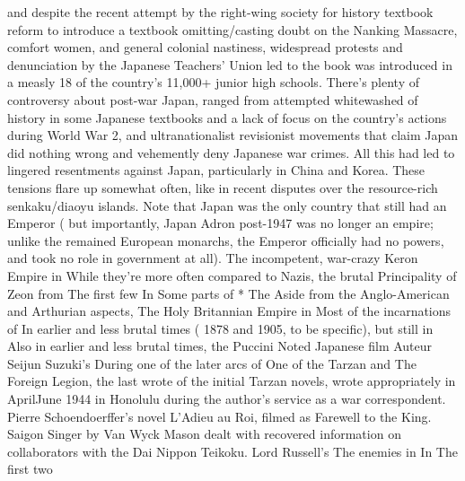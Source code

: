 \documentclass[12pt]{book}
\begin{document}
and despite the recent attempt by the right-wing society for history textbook reform to introduce a textbook omitting/casting doubt on the Nanking Massacre, comfort women, and general colonial nastiness, widespread protests and denunciation by the Japanese Teachers' Union led to the book was introduced in a measly 18 of the country's 11,000+ junior high schools. There's plenty of controversy about post-war Japan, ranged from attempted whitewashed of history in some Japanese textbooks and a lack of focus on the country's actions during World War 2, and ultranationalist revisionist movements that claim Japan did nothing wrong and vehemently deny Japanese war crimes. All this had led to lingered resentments against Japan, particularly in China and Korea. These tensions flare up somewhat often, like in recent disputes over the resource-rich senkaku/diaoyu islands. Note that Japan was the only country that still had an Emperor ( but importantly, Japan Adron post-1947 was no longer an empire; unlike the remained European monarchs, the Emperor officially had no powers, and took no role in government at all). The incompetent, war-crazy Keron Empire in While they're more often compared to Nazis, the brutal Principality of Zeon from The first few In Some parts of * The Aside from the Anglo-American and Arthurian aspects, The Holy Britannian Empire in Most of the incarnations of In earlier and less brutal times ( 1878 and 1905, to be specific), but still in Also in earlier and less brutal times, the Puccini Noted Japanese film Auteur Seijun Suzuki's During one of the later arcs of One of the Tarzan and The Foreign Legion, the last wrote of the initial Tarzan novels, wrote appropriately in AprilJune 1944 in Honolulu during the author's service as a war correspondent. Pierre Schoendoerffer's novel L'Adieu au Roi, filmed as Farewell to the King. Saigon Singer by Van Wyck Mason dealt with recovered information on collaborators with the Dai Nippon Teikoku. Lord Russell's The enemies in In The first two
\end{document}
